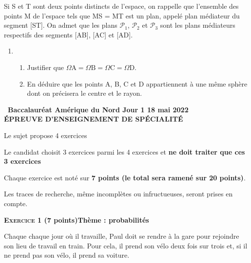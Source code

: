 \documentclass[10pt,a4paper]{article}
\begin{document}
\medskip

Si S et T sont deux points distincts de l'espace, on rappelle que l'ensemble des points M de l'espace tels que MS = MT est un plan, appelé plan médiateur du segment [ST]. On admet que les plans $\mathcal{P}_1$,\: $\mathcal{P}_2$ et $\mathcal{P}_3$ sont les plans médiateurs respectifs des
segments [AB], [AC] et [AD].

\begin{enumerate}[resume]
\item
	\begin{enumerate}
		\item Justifier que $\Omega \text{A} = \Omega \text{B} = \Omega \text{C} = \Omega \text{D}$.
		\item En déduire que les points A, B, C et D appartiennent à une même sphère dont
on précisera le centre et le rayon.
	\end{enumerate}
\end{enumerate}

\newpage
\hypertarget{AmeriqueNord1}{}

\label{AmeriqueNord1}

\pagestyle{fancy}
\thispagestyle{empty}

\begin{center}{\Large\textbf{\decofourleft~Baccalauréat Amérique du Nord Jour 1 18 mai 2022~\decofourright\\[6pt] ÉPREUVE D'ENSEIGNEMENT DE SPÉCIALITÉ}}
\end{center}

\vspace{0,25cm}

Le sujet propose 4 exercices

Le candidat choisit 3 exercices parmi les 4 exercices et \textbf{ne doit traiter que ces 3 exercices}

Chaque exercice est noté sur \textbf{7 points (le total sera ramené sur 20 points)}.

Les traces de recherche, même incomplètes ou infructueuses, seront prises en compte.

\bigskip

\textbf{\textsc{Exercice 1} \quad (7 points)\hfill Thème : probabilités}

\medskip

Chaque chaque jour où il travaille, Paul doit se rendre à la gare pour rejoindre son lieu de travail en train. Pour cela, il prend son vélo deux fois sur trois et, si il ne prend pas son vélo, il prend sa voiture.
\end{document}
